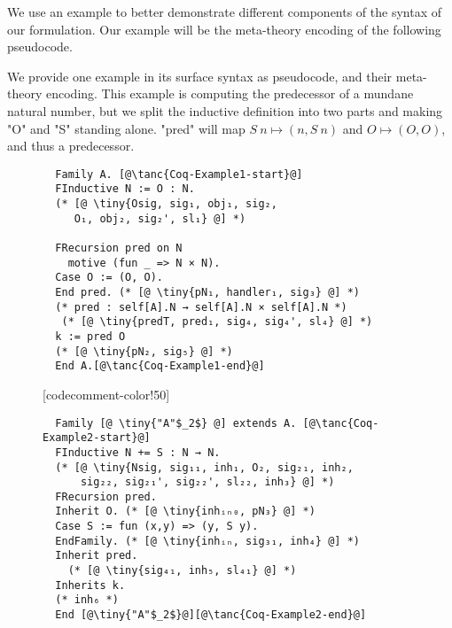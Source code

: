 We use an example to better demonstrate different components of the
syntax of our formulation. Our example will be the meta-theory encoding
of the following pseudocode.

We provide one example in its surface syntax as pseudocode, and their
meta-theory encoding. This example is computing the predecessor of a
mundane natural number, but we split the inductive definition into two
parts and making "O" and "S" standing alone.
"pred" will map $S~n \mapsto (n, S~n)$ and $O \mapsto (O, O)$, and thus a predecessor.

\begin{figure}[!htb]\label{fig:example-pseudocode}
  
  \begin{minipage}{\textwidth}
  \begin{multicols}{2}
  
  
  
  
  \begin{lstlisting} 
  Family A. [@\tanc{Coq-Example1-start}@]
  FInductive N := O : N. 
  (* [@ \tiny{Osig, sig₁, obj₁, sig₂,
     O₁, obj₂, sig₂', sl₁} @] *)

  FRecursion pred on N
    motive (fun _ => N × N).
  Case O := (O, O). 
  End pred. (* [@ \tiny{pN₁, handler₁, sig₃} @] *)
  (* pred : self[A].N → self[A].N × self[A].N *)
   (* [@ \tiny{predT, pred₁, sig₄, sig₄', sl₄} @] *) 
  k := pred O 
  (* [@ \tiny{pN₂, sig₅} @] *)  
  End A.[@\tanc{Coq-Example1-end}@]
  \end{lstlisting}
  
  [codecomment-color!50]
  
  
  \columnbreak
  
  
  
  
  \begin{lstlisting}
  Family [@ \tiny{"A"$_2$} @] extends A. [@\tanc{Coq-Example2-start}@]
  FInductive N += S : N → N.
  (* [@ \tiny{Nsig, sig₁₁, inh₁, O₂, sig₂₁, inh₂, 
      sig₂₂, sig₂₁', sig₂₂', sl₂₂, inh₃} @] *)
  FRecursion pred.
  Inherit O. (* [@ \tiny{inhᵢₙ₀, pN₃} @] *)
  Case S := fun (x,y) => (y, S y).
  EndFamily. (* [@ \tiny{inhᵢₙ, sig₃₁, inh₄} @] *)
  Inherit pred.
    (* [@ \tiny{sig₄₁, inh₅, sl₄₁} @] *)
  Inherits k. 
  (* inh₆ *)
  End [@\tiny{"A"$_2$}@][@\tanc{Coq-Example2-end}@]
  \end{lstlisting}
  

\end{multicols}
\end{minipage}
\end{figure}
